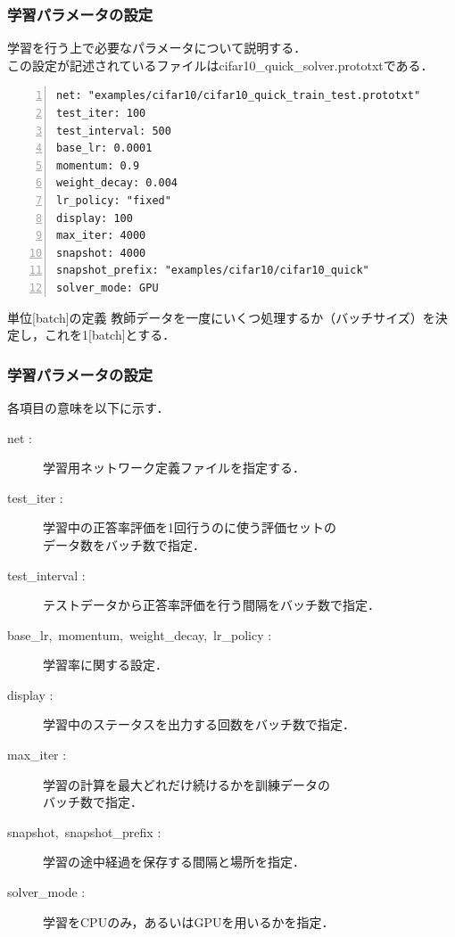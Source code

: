 \documentclass[dvipdfmx,11pt,notheorems]{beamer}
\theoremstyle{definition}
\begin{document}

\begin{frame}[fragile]\frametitle{学習パラメータの設定}
学習を行う上で必要なパラメータについて説明する．\\この設定が記述されているファイルはcifar10\_quick\_solver.prototxtである．

\begin{lstlisting}[basicstyle=\ttfamily\footnotesize, frame=single, firstnumber=1, numbers=left, breaklines=true]
net: "examples/cifar10/cifar10_quick_train_test.prototxt"
test_iter: 100
test_interval: 500
base_lr: 0.0001
momentum: 0.9
weight_decay: 0.004
lr_policy: "fixed"
display: 100
max_iter: 4000
snapshot: 4000
snapshot_prefix: "examples/cifar10/cifar10_quick"
solver_mode: GPU
\end{lstlisting}
\begin{exampleblock}{単位[batch]の定義}
教師データを一度にいくつ処理するか（バッチサイズ）を決定し，これを1[batch]とする．
\end{exampleblock}
\end{frame}

\begin{frame}[fragile]\frametitle{学習パラメータの設定}
各項目の意味を以下に示す．
\begin{description}
  \item[net :]学習用ネットワーク定義ファイルを指定する．
  \item[test\_iter :]学習中の正答率評価を1回行うのに使う評価セットの\\データ数をバッチ数で指定．
  \item[test\_interval :]テストデータから正答率評価を行う間隔をバッチ数で指定．
  \item[base\_lr,\ momentum,\ weight\_decay,\ lr\_policy :]学習率に関する設定．
  \item[display :]学習中のステータスを出力する回数をバッチ数で指定．
  \item[max\_iter :]学習の計算を最大どれだけ続けるかを訓練データの\\バッチ数で指定．
  \item[snapshot,\ snapshot\_prefix :]学習の途中経過を保存する間隔と場所を指定．
  \item[solver\_mode :]学習をCPUのみ，あるいはGPUを用いるかを指定．
\end{description}
\end{frame}
\end{document}
